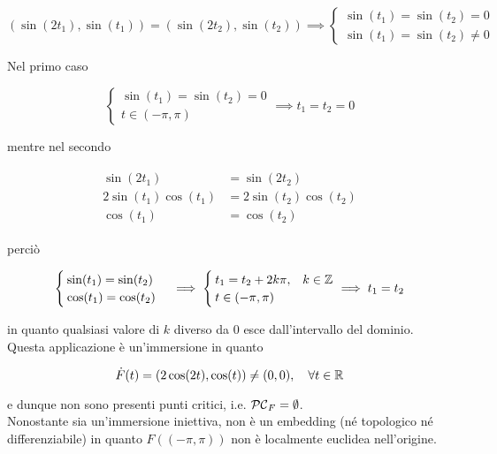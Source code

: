 \begin{equation}
	(\sin(2t_{1}), \sin(t_{1})) = (\sin(2t_{2}), \sin(t_{2})) %
	\implies %
	\begin{cases}
		\sin(t_{1}) = \sin(t_{2}) = 0 \\
		\sin(t_{1}) = \sin(t_{2}) \neq 0
	\end{cases}
\end{equation}

Nel primo caso

\begin{equation}
	\begin{cases}
		\sin(t_{1}) = \sin(t_{2}) = 0 \\
		t \in (-\pi,\pi)
	\end{cases} %
	\implies %
	t_{1} = t_{2} = 0
\end{equation}

mentre nel secondo

\begin{align}
	\begin{split}
		\sin(2t_{1}) &= \sin(2t_{2}) \\
		2 \sin(t_{1}) \cos(t_{1}) &= 2 \sin(t_{2}) \cos(t_{2}) \\
		\cos(t_{1}) &= \cos(t_{2})
	\end{split}		
\end{align}

perciò

\begin{equation}
	\begin{cases}
		\sin(t_{1}) = \sin(t_{2}) \\
		\cos(t_{1}) = \cos(t_{2})
	\end{cases} %
	\implies %
	\begin{cases}
		t_{1} = t_{2} + 2 k \pi, & k \in \Z \\
		t \in (-\pi,\pi)
	\end{cases} %
	\implies %
	t_{1} = t_{2}
\end{equation}

in quanto qualsiasi valore di $ k $ diverso da 0 esce dall'intervallo del dominio.\\
Questa applicazione è un'immersione in quanto

\begin{equation}
	\dot{F}(t) = (2 \cos(2t), \cos(t)) \neq (0,0) \qcomma \forall t \in \R
\end{equation}

e dunque non sono presenti punti critici, i.e. $ \mathcal{PC}_{F} = \emptyset $.\\
Nonostante sia un'immersione iniettiva, non è un embedding (né topologico né differenziabile) in quanto $ F((-\pi,\pi)) $ non è localmente euclidea nell'origine.

